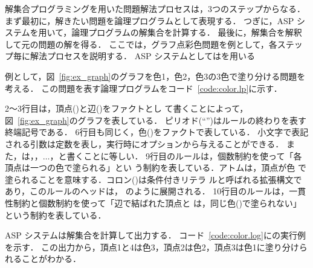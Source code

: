 


解集合プログラミングを用いた問題解法プロセスは，3つのステップからなる．
まず最初に，解きたい問題を論理プログラムとして表現する．
つぎに，ASP システムを用いて，論理プログラムの解集合を計算する．
最後に，解集合を解釈して元の問題の解を得る．
%
ここでは，グラフ点彩色問題を例として，各ステップ毎に解法プロセスを説明する．
ASP システムとしては{\clingo}を用いる

例として，図~\ref{fig:ex_graph}のグラフを色1，色2，色3の3色で塗り分ける問題を考える．
この問題を表す論理プログラムをコード~\ref{code:color.lp}に示す．

2〜3行目は，頂点()と辺()をファクトとし
て書くことによって，図~\ref{fig:ex_graph}のグラフを表している．
ピリオド(``'')はルールの終わりを表す終端記号である．
6行目も同じく，色()をファクトで表している．
小文字で表記される引数は定数を表し，{\clingo}実行時にオプションから与えることができる．
また，は，，$\ldots$，と書くことに等しい．
%
9行目のルールは，個数制約を使って「各頂点は一つの色で塗られる」とい
う制約を表している．アトムは，頂点が色
で塗られることを意味する．コロン(\code{:})は条件付きリテラ
ルと呼ばれる拡張構文であり，このルールのヘッドは，
のように展開される．
10行目のルールは，一貫性制約と個数制約を使って「辺で結ばれた頂点と
は，同じ色()で塗られない」という制約を表している．

ASP システムは解集合を計算して出力する．
コード~\ref{code:color.log}に{\clingo}の実行例を示す．
この出力から，頂点1と4は色3，頂点2は色2，頂点3は色1に塗り分けられることがわかる．

